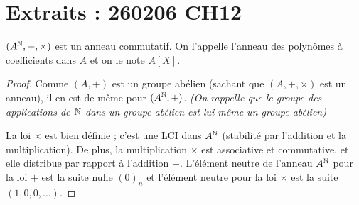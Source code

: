 \documentclass[12pt,a4paper]{report}
\begin{document}
\vspace{1em}


\section*{Extraits : 260206 CH12}


\begin{theorem}
    $(A^{\mathbb{N}}, +, \times)$ est un anneau commutatif. On l'appelle l'anneau des polynômes à coefficients dans $A$ et on le note $A[X]$.
\end{theorem}

\begin{proof}
    Comme $(A,+)$ est un groupe abélien (sachant que $(A,+,\times)$ est un anneau), il en est de même pour $(A^{\mathbb{N}}, +)$. \textit{(On rappelle que le groupe des applications de $\mathbb{N}$ dans un groupe abélien est lui-même un groupe abélien)}
    
    La loi $\times$ est bien définie ; c'est une LCI dans $A^{\mathbb{N}}$ (stabilité par l'addition et la multiplication). De plus, la multiplication $\times$ est associative et commutative, et elle distribue par rapport à l'addition $+$. L'élément neutre de l'anneau $A^{\mathbb{N}}$ pour la loi $+$ est la suite nulle $(0)_n$ et l'élément neutre pour la loi $\times$ est la suite $(1, 0, 0, \ldots)$. 


\end{proof}
\end{document}
